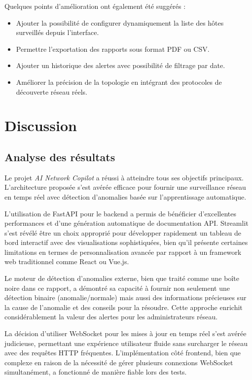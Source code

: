 \documentclass[12pt,a4paper]{report}
\begin{document}
Quelques points d'amélioration ont également été suggérés :
\begin{itemize}
    \item Ajouter la possibilité de configurer dynamiquement la liste des hôtes surveillés depuis l'interface.
    \item Permettre l'exportation des rapports sous format PDF ou CSV.
    \item Ajouter un historique des alertes avec possibilité de filtrage par date.
    \item Améliorer la précision de la topologie en intégrant des protocoles de découverte réseau réels.
\end{itemize}

\chapter{Discussion}
\section{Analyse des résultats}
Le projet \textit{AI Network Copilot} a réussi à atteindre tous ses objectifs principaux. L'architecture proposée s'est avérée efficace pour fournir une surveillance réseau en temps réel avec détection d'anomalies basée sur l'apprentissage automatique.

L'utilisation de FastAPI pour le backend a permis de bénéficier d'excellentes performances et d'une génération automatique de documentation API. Streamlit s'est révélé être un choix approprié pour développer rapidement un tableau de bord interactif avec des visualisations sophistiquées, bien qu'il présente certaines limitations en termes de personnalisation avancée par rapport à un framework web traditionnel comme React ou Vue.js.

Le moteur de détection d'anomalies externe, bien que traité comme une boîte noire dans ce rapport, a démontré sa capacité à fournir non seulement une détection binaire (anomalie/normale) mais aussi des informations précieuses sur la cause de l'anomalie et des conseils pour la résoudre. Cette approche enrichit considérablement la valeur des alertes pour les administrateurs réseau.

La décision d'utiliser WebSocket pour les mises à jour en temps réel s'est avérée judicieuse, permettant une expérience utilisateur fluide sans surcharger le réseau avec des requêtes HTTP fréquentes. L'implémentation côté frontend, bien que complexe en raison de la nécessité de gérer plusieurs connexions WebSocket simultanément, a fonctionné de manière fiable lors des tests.
\end{document}
